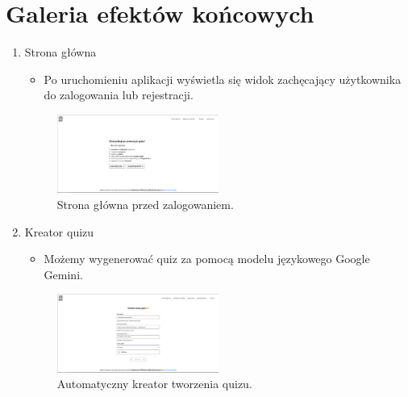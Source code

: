 \documentclass{article}
\begin{document}
    \section{Galeria efektów końcowych}
      \begin{enumerate}

        \item Strona główna \\
        \begin{minipage}{0.4\textwidth}
          \begin{itemize}
            \item Po uruchomieniu aplikacji wyświetla się widok zachęcający użytkownika do zalogowania lub rejestracji.
          \end{itemize}
        \end{minipage}
        \begin{minipage}{0.6\textwidth}
          \begin{figure}[H]
            \centering
            \includegraphics[width=0.5\textwidth]{../_assets/web/index.png}
            \caption{Strona główna przed zalogowaniem.}
            \label{fig:index}
          \end{figure}
        \end{minipage}

        \item Kreator quizu \\
        \begin{minipage}{0.4\textwidth}
          \begin{itemize}
            \item Możemy wygenerować quiz za pomocą modelu językowego Google Gemini.
          \end{itemize}
        \end{minipage}
        \begin{minipage}{0.6\textwidth}
          \begin{figure}[H]
            \centering
            \includegraphics[width=0.5\textwidth]{../_assets/web/createAi.png}
            \caption{Automatyczny kreator tworzenia quizu.}
            \label{fig:createAi}
          \end{figure}
        \end{minipage}


\end{enumerate}
\end{document}
